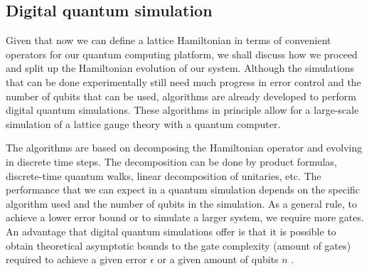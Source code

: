 \documentclass[a4paper]{report}
\begin{document}
\begin{spacing}{1.1}





\subsection{Digital quantum simulation}

Given that now we can define a lattice Hamiltonian in terms of convenient operators for our quantum computing platform, we shall discuss how we proceed and split up the Hamiltonian evolution of our system. Although the simulations that can be done experimentally still need much progress in error control and the number of qubits that can be used, algorithms are already developed to perform digital quantum simulations. These algorithms in principle allow for a large-scale simulation of a lattice gauge theory with a quantum computer.

The algorithms are based on decomposing the Hamiltonian operator and evolving in discrete time steps. The decomposition can be done by product formulas, discrete-time quantum walks, linear decomposition of unitaries, etc. \cite{childs2018toward} The performance that we can expect in a quantum simulation depends on the specific algorithm used and the number of qubits in the simulation. As a general rule, to achieve a lower error bound or to simulate a larger system, we require more gates. An advantage that digital quantum simulations offer is that it is possible to obtain theoretical asymptotic bounds to the gate complexity (amount of gates) required to achieve a given error $\epsilon$ or a given amount of qubits $n$ \cite{childs2018toward}.


\end{spacing}
\end{document}
